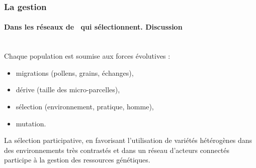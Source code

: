 \begin{frame}
\frametitle{La gestion \insitu}
\framesubtitle{Dans les réseaux de \MSPs~qui sélectionnent. Discussion}

 \\

Chaque population est soumise aux forces évolutives : 
\begin{itemize}
\item migrations (pollens, grains, échanges),
\item dérive (taille des micro-parcelles), 
\item sélection (environnement, pratique, homme), 
\item mutation.
\end{itemize}

\begin{block}{}
La sélection participative, en favorisant l'utilisation de variétés hétérogènes dans des environnements très contrastés et dans un réseau d'acteurs connectés participe à la gestion des ressources génétiques.%
\end{block}

\end{frame}


